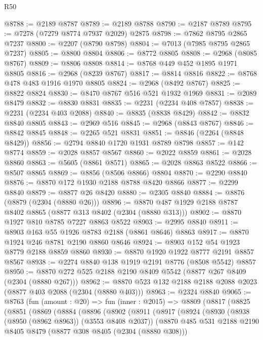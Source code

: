 \begin{lexlean}{R50}
\begin{coremodule}
@8788 := @2189 @8787
@8789 := @2189 @8788
@8790 := @2187 @8789
@8795 := @7278 (@7279 @8774 @7937 @2029) @2875
@8798 := @7862 @8795 @2865 @7237
@8800 := @2207 (@8790 @8798)
@8804 := @7013 (@7985 @8795 @2865 @7237)
@8805 := @8800 @8804
@8806 := @8772 @8805
@8808 := @2968 (@8085 @8767)
@8809 := @8806 @8808
@8814 := @8768 @449 @452 @1895 @1971 @8805
@8816 := @2968 (@8239 @8767)
@8817 := @8814 @8816
@8822 := @8768 @478 @483 @1916 @1970 @8805
@8824 := @2968 (@8492 @8767)
@8825 := @8822 @8824
@8830 := @8470 @8767 @516 @521 @1932 @1969
@8831 := @2089 @8479
@8832 := @8830 @8831
@8835 := @2231 (@2234 @408 @7857)
@8838 := @2231 (@2234 @403 @2088)
@8840 := @8835 (@8838 @8429)
@8842 := @8832 @8840 @8805
@8843 := @2969 @516
@8845 := @2968 (@8843 @8767)
@8846 := @8842 @8845
@8848 := @2265 @521 @8831
@8851 := @8846 (@2264 (@8848 @8429))
@8856 := @2794 @8840 @1720 @1931 @8789 @8798
@8857 := @142 @8774
@8859 := @2028 @8857 @8567
@8860 := @2022 @8859
@8861 := @2028 @8860
@8863 := @5605 (@8861 @8571)
@8865 := @2028 @8863 @8522
@8866 := @8507 @8865
@8869 := @8856 (@8506 @8866) @8804
@8870 := @2290 @8840
@8876 := @8870 @172 @1930 @2188 @8788 @8420 @8866
@8877 := @2299 @8840
@8879 := @8877 @26 @8420
@8880 := @2305 @8840
@8884 := @8876 (@8879 (@2304 (@8880 @26)))
@8896 := @8870 @487 @1929 @2188 @8787 @8402 @8865 (@8877 @313 @8402 (@2304 (@8880 @313)))
@8902 := @8870 @1927 @810 @8785 @7227 @8863 @8522
@8903 := @2995 @8840
@8911 := @8903 @163 @55 @1926 @8783 @2188 (@8861 @8646) @8863
@8917 := @8870 @1924 @246 @8781 @2190 @8860 @8646
@8924 := @8903 @152 @54 @1923 @8779 @2188 @8859 @8860
@8930 := @8870 @1920 @1922 @8777 @2191 @8857 @8567
@8938 := @2274 @8840 @138 @1919 @2191 @8776 (@8508 @5542) @8857
@8950 := @8870 @272 @525 @2188 @2190 @8409 @5542 (@8877 @267 @8409 (@2304 (@8880 @267)))
@8962 := @8870 @523 @132 @2188 @2188 @2088 @2023 (@8877 @403 @2088 (@2304 (@8880 @403)))
@8963 := @2324 @8840
@9065 := @8763
    (fun (amount : @20) =>
    fun (inner : @2015) =>
    @8809
      (@8817
        (@8825
          (@8851
            (@8869
              (@8884
                (@8896
                  (@8902
                    (@8911
                      (@8917
                        (@8924
                          (@8930
                            (@8938 (@8950 (@8962 @8963)) (@3553 @8408 @2037))
                            (@8870
                              @485
                              @531
                              @2188
                              @2190
                              @8405
                              @8479
                              (@8877 @308 @8405 (@2304 (@8880 @308)))

\end{coremodule}
\end{lexlean}
